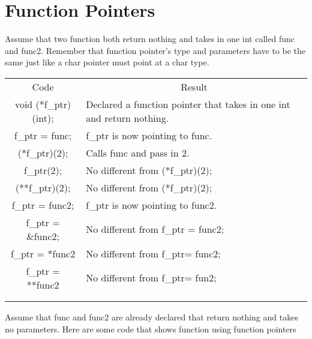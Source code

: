 \documentclass{article}
\begin{document}
\section{Function Pointers}
Assume that two function both return nothing and takes in one int called func and func2. Remember that function pointer's type and parameters have to be the same just like a char pointer must point at a char type. \\

\begin{table}[h]
\begin{tabular}{cl}
Code                 & \multicolumn{1}{c}{Result}                                            \\
void (*f\_ptr)(int); & Declared a function pointer that takes in one int and return nothing. \\
f\_ptr = func;       & f\_ptr is now pointing to func.                                        \\
(*f\_ptr)(2);        & Calls func and pass in 2.                                               \\
f\_ptr(2);           & No different from (*f\_ptr)(2);                                       \\
(**f\_ptr)(2);       & No different from (*f\_ptr)(2);                                       \\
f\_ptr = func2;      & f\_ptr is now pointing to func2.                                       \\
f\_ptr = \&func2;    & No different from f\_ptr = func2;                                     \\
f\_ptr = *func2      & No different from f\_ptr= func2;                                      \\
f\_ptr = **func2     & No different from f\_ptr= fun2;                                       \\
\multicolumn{1}{l}{} &                                                                       \\
\multicolumn{1}{l}{} &                                                                      
\end{tabular}
\end{table}
Assume that func and func2 are already declared that return nothing and takes no parameters. Here are some code that shows function using function pointers\\
\end{document}
